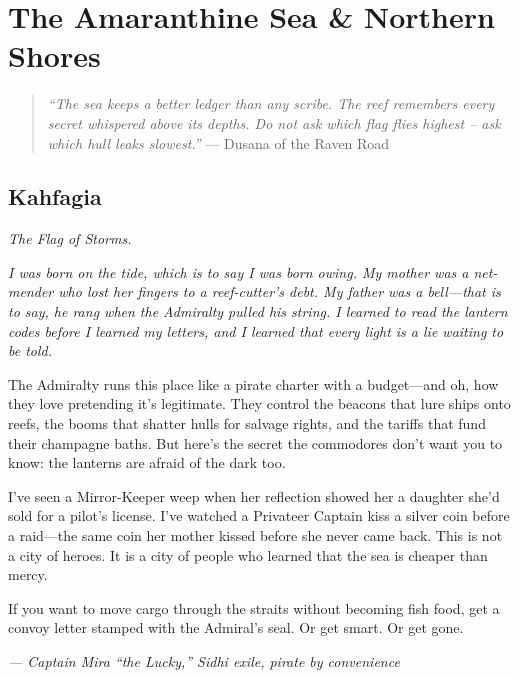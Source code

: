 \part{The Amaranthine Sea \& Northern Shores}

\begin{quote}
  \small
  \textit{``The sea keeps a better ledger than any scribe. The reef remembers every secret whispered above its depths. Do not ask which flag flies highest -- ask which hull leaks slowest.''}
  \noindent --- Dusana of the Raven Road
  \end{quote}

\chapter{Kahfagia}
\emph{The Flag of Storms.}

\noindent
{\Large
\textit{I was born on the tide, which is to say I was born owing. My mother was a net-mender who lost her fingers to a reef-cutter's debt. My father was a bell---that is to say, he rang when the Admiralty pulled his string. I learned to read the lantern codes before I learned my letters, and I learned that every light is a lie waiting to be told.}

\vspace{0.5em}

The Admiralty runs this place like a pirate charter with a budget---and oh, how they love pretending it's legitimate. They control the beacons that lure ships onto reefs, the booms that shatter hulls for salvage rights, and the tariffs that fund their champagne baths. But here's the secret the commodores don't want you to know: the lanterns are afraid of the dark too.

\vspace{0.5em}

I've seen a Mirror-Keeper weep when her reflection showed her a daughter she'd sold for a pilot's license. I've watched a Privateer Captain kiss a silver coin before a raid---the same coin her mother kissed before she never came back. This is not a city of heroes. It is a city of people who learned that the sea is cheaper than mercy.

\vspace{0.5em}

If you want to move cargo through the straits without becoming fish food, get a convoy letter stamped with the Admiral's seal. Or get smart. Or get gone.

\vspace{1em}

\noindent\textit{--- Captain Mira ``the Lucky,'' Sidhi exile, pirate by convenience}
}

